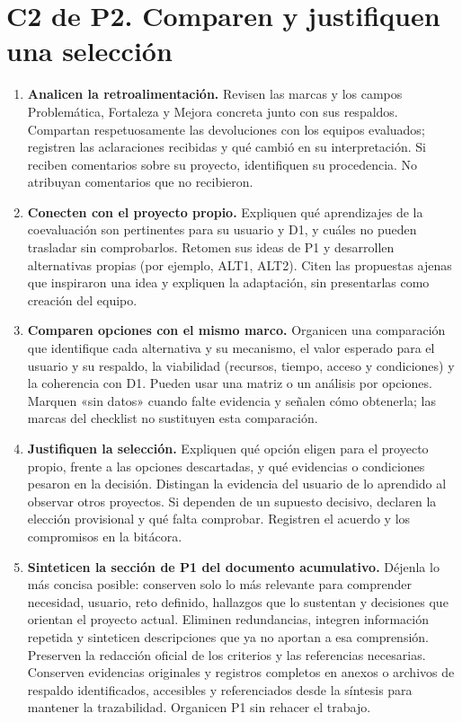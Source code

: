 \newpage
\section*{C2 de P2. Comparen y justifiquen una selección}
\begin{enumerate}[resume=pasos]
\item \textbf{Analicen la retroalimentación.} Revisen las marcas y los campos Problemática, Fortaleza y Mejora concreta junto con sus respaldos. Compartan respetuosamente las devoluciones con los equipos evaluados; registren las aclaraciones recibidas y qué cambió en su interpretación. Si reciben comentarios sobre su proyecto, identifiquen su procedencia. No atribuyan comentarios que no recibieron.
\item \textbf{Conecten con el proyecto propio.} Expliquen qué aprendizajes de la coevaluación son pertinentes para su usuario y D1, y cuáles no pueden trasladar sin comprobarlos. Retomen sus ideas de P1 y desarrollen alternativas propias (por ejemplo, ALT1, ALT2). Citen las propuestas ajenas que inspiraron una idea y expliquen la adaptación, sin presentarlas como creación del equipo.
\item \textbf{Comparen opciones con el mismo marco.} Organicen una comparación que identifique cada alternativa y su mecanismo, el valor esperado para el usuario y su respaldo, la viabilidad (recursos, tiempo, acceso y condiciones) y la coherencia con D1. Pueden usar una matriz o un análisis por opciones. Marquen «sin datos» cuando falte evidencia y señalen cómo obtenerla; las marcas del checklist no sustituyen esta comparación.
\item \textbf{Justifiquen la selección.} Expliquen qué opción eligen para el proyecto propio, frente a las opciones descartadas, y qué evidencias o condiciones pesaron en la decisión. Distingan la evidencia del usuario de lo aprendido al observar otros proyectos. Si dependen de un supuesto decisivo, declaren la elección provisional y qué falta comprobar. Registren el acuerdo y los compromisos en la bitácora.
\item \textbf{Sinteticen la sección de P1 del documento acumulativo.} Déjenla lo más concisa posible: conserven solo lo más relevante para comprender necesidad, usuario, reto definido, hallazgos que lo sustentan y decisiones que orientan el proyecto actual. Eliminen redundancias, integren información repetida y sinteticen descripciones que ya no aportan a esa comprensión. Preserven la redacción oficial de los criterios y las referencias necesarias. Conserven evidencias originales y registros completos en anexos o archivos de respaldo identificados, accesibles y referenciados desde la síntesis para mantener la trazabilidad. Organicen P1 sin rehacer el trabajo.
\end{enumerate}

